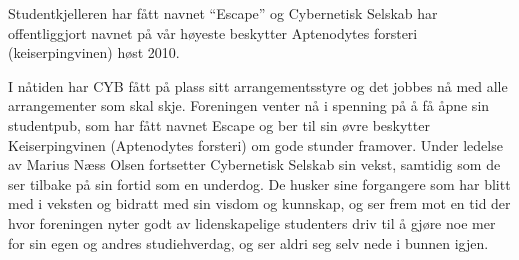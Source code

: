 \documentclass[../main.tex]{subfiles}
\begin{document}

Studentkjelleren har fått navnet “Escape” og Cybernetisk Selskab har offentliggjort navnet på vår høyeste beskytter Aptenodytes forsteri (keiserpingvinen) høst 2010. 


I nåtiden har CYB fått på plass sitt arrangementsstyre og det jobbes nå med alle arrangementer som skal skje. Foreningen venter nå i spenning på å få åpne sin studentpub, som har fått navnet Escape og ber til sin øvre beskytter Keiserpingvinen (Aptenodytes forsteri) om gode stunder framover. Under ledelse av Marius Næss Olsen fortsetter Cybernetisk Selskab sin vekst, samtidig som de ser tilbake på sin fortid som en underdog. De husker sine forgangere som har blitt med i veksten og bidratt med sin visdom og kunnskap, og ser frem mot en tid der hvor foreningen nyter godt av lidenskapelige studenters driv til å gjøre noe mer for sin egen og andres studiehverdag, og ser aldri seg selv nede i bunnen igjen.
\end{document}
